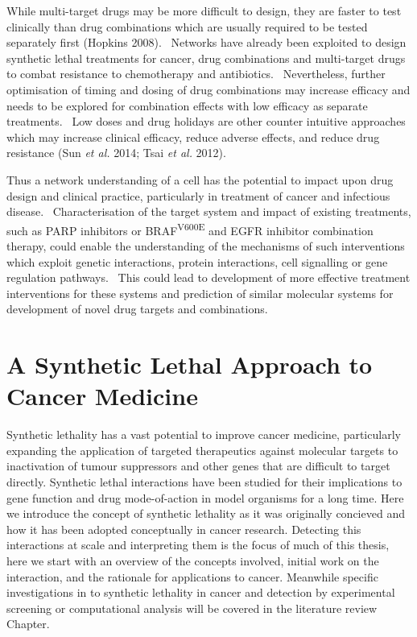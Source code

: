 While multi-target drugs may be more difficult to design, they are faster to test clinically than drug combinations which are usually required to be tested separately first (Hopkins 2008). \ Networks have already been exploited to design synthetic lethal treatments for cancer, drug combinations and multi-target drugs to combat resistance to chemotherapy and antibiotics. \ Nevertheless, further optimisation of timing and dosing of drug combinations may increase efficacy and needs to be explored for combination effects with low efficacy as separate treatments. \ Low doses and drug holidays are other counter intuitive approaches which may increase clinical efficacy, reduce adverse effects, and reduce drug resistance (Sun\textit{ et al.} 2014; Tsai\textit{ et al.} 2012). \  

Thus a network understanding of a cell has the potential to impact upon drug design and clinical practice, particularly in treatment of cancer and infectious disease. \ Characterisation of the target system and impact of existing treatments, such as PARP inhibitors or BRAF\textsuperscript{V600E} and EGFR inhibitor combination therapy, could enable the understanding of the mechanisms of such interventions which exploit genetic interactions, protein interactions, cell signalling or gene regulation pathways. \ This could lead to development of more effective treatment interventions for these systems and prediction of similar molecular systems for development of novel drug targets and combinations. \  



\section{A Synthetic Lethal Approach to Cancer Medicine}

Synthetic lethality has a vast potential to improve cancer medicine, particularly expanding the application of targeted therapeutics against molecular targets to inactivation of tumour suppressors and other genes that are difficult to target directly. Synthetic lethal interactions have been studied for their implications to gene function and drug mode-of-action in model organisms for a long time. Here we introduce the concept of synthetic lethality as it was originally concieved and how it has been adopted conceptually in cancer research. Detecting this interactions at scale and interpreting them is the focus of much of this thesis, here we start with an overview of the concepts involved, initial work on the interaction, and the rationale for applications to cancer. Meanwhile specific investigations in to synthetic lethality in cancer and detection by experimental screening or computational analysis will be covered in the literature review Chapter.


